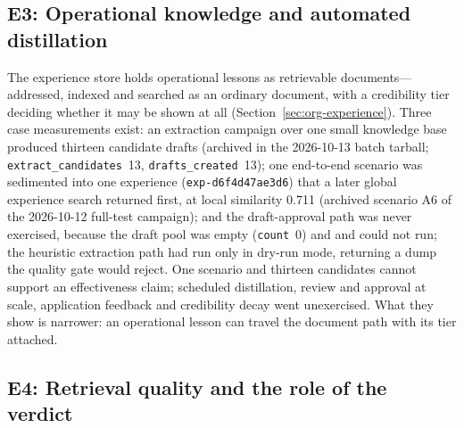 \subsection{E3: Operational knowledge and automated distillation}
\label{sec:e3}

The experience store holds operational lessons as retrievable
documents---addressed, indexed and searched as an ordinary document, with a
credibility tier deciding whether it may be shown at all
(Section~\ref{sec:org-experience}). Three case measurements exist: an
extraction campaign over one small knowledge base produced thirteen
candidate drafts (archived  in the 2026-10-13
batch tarball; \texttt{extract\_candidates}~13, \texttt{drafts\_created}~13);
one end-to-end scenario was sedimented into one experience
(\texttt{exp-d6f4d47ae3d6}) that a later global experience search returned
first, at local similarity 0.711 (archived scenario A6 of the 2026-10-12
full-test campaign); and the draft-approval path was never exercised, because
the draft pool was empty (\texttt{count}~0) and 
and  could not run; the heuristic extraction
path had run only in dry-run mode, returning a dump the quality gate would
reject. One scenario and thirteen candidates cannot support an effectiveness
claim; scheduled distillation, review and approval at scale, application
feedback and credibility decay went unexercised. What they show is narrower:
an operational lesson can travel the document path with its tier attached.

\subsection{E4: Retrieval quality and the role of the verdict}
\label{sec:e4}
\label{sec:eval-retrieval}

